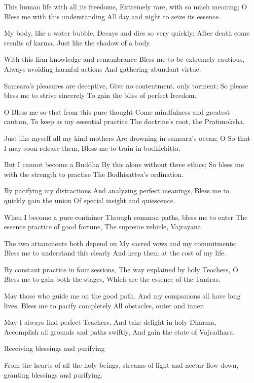 \documentclass{book}\usepackage[]{graphicx}\usepackage[]{color}
\begin{document}
This human life with all its freedoms,
Extremely rare, with so much meaning;
O Bless me with this understanding
All day and night to seize its essence.

My body, like a water bubble,
Decays and dies so very quickly;
After death come results of karma,
Just like the shadow of a body.

With this firm knowledge and remembrance
Bless me to be extremely cautious,
Always avoiding harmful actions
And gathering abundant virtue.

Samsara's pleasures are deceptive,
Give no contentment, only torment;
So please bless me to strive sincerely
To gain the bliss of perfect freedom.

O Bless me so that from this pure thought
Come mindfulness and greatest caution,
To keep as my essential practice
The doctrine's root, the Pratimoksha.

Just like myself all my kind mothers
Are drowning in samsara's ocean;
O So that I may soon release them,
Bless me to train in bodhichitta.

But I cannot become a Buddha
By this alone without three ethics;
So bless me with the strength to practise
The Bodhisattva's ordination.

By pacifying my distractions
And analyzing perfect meanings,
Bless me to quickly gain the union
Of special insight and quiescence.

When I become a pure container
Through common paths, bless me to enter
The essence practice of good fortune,
The supreme vehicle, Vajrayana.

The two attainments both depend on
My sacred vows and my commitments;
Bless me to understand this clearly
And keep them at the cost of my life.

By constant practice in four sessions,
The way explained by holy Teachers,
O Bless me to gain both the stages,
Which are the essence of the Tantras.

May those who guide me on the good path,
And my companions all have long lives;
Bless me to pacify completely
All obstacles, outer and inner.

May I always find perfect Teachers,
And take delight in holy Dharma,
Accomplish all grounds and paths swiftly,
And gain the state of Vajradhara.

Receiving blessings and purifying

From the hearts of all the holy beings,
streams of light and nectar flow down,
granting blessings and purifying.
\end{document}
